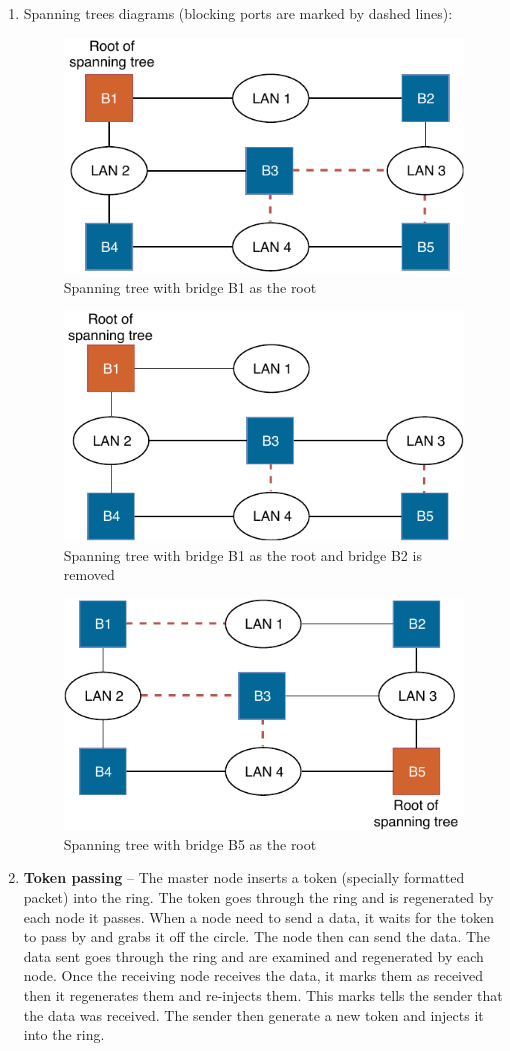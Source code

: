 \documentclass[a4paper, 11pt]{article}
\begin{document}
\begin{enumerate}
		\item %
			Spanning trees diagrams (blocking ports are marked by dashed lines):
			\begin{figure}[H]
				\centering
				\includegraphics[width=0.4\linewidth]{inc/spanning_tree_b1_root}
				\caption{Spanning tree with bridge B1 as the root}
				\label{figure:spanning_tree_b1_root}
			\end{figure}
			\begin{figure}[H]
				\centering
				\includegraphics[width=0.4\linewidth]{inc/spanning_tree_b1_root_b2_removed}
				\caption{Spanning tree with bridge B1 as the root and bridge B2 is removed}
				\label{figure:spanning_tree_b1_root_b2_removed}
			\end{figure}
			\begin{figure}[H]
				\centering
				\includegraphics[width=0.4\linewidth]{inc/spanning_tree_b5_root}
				\caption{Spanning tree with bridge B5 as the root}
				\label{figure:spanning_tree_b5_root}
			\end{figure}

		\item %
			\textbf{Token passing} -- The master node inserts a token (specially formatted packet) into the ring.
			The token goes through the ring and is regenerated by each node it passes. When a node need to send a data,
			it waits for the token to pass by and grabs it off the circle. The node then can send the data.
			The data sent goes through the ring and are examined and regenerated by each node. Once the receiving node
			receives the data, it marks them as received then it regenerates them and re-injects them. This marks tells
			the sender that the data was received. The sender then generate a new token and injects it into the ring.


\end{enumerate}
\end{document}
